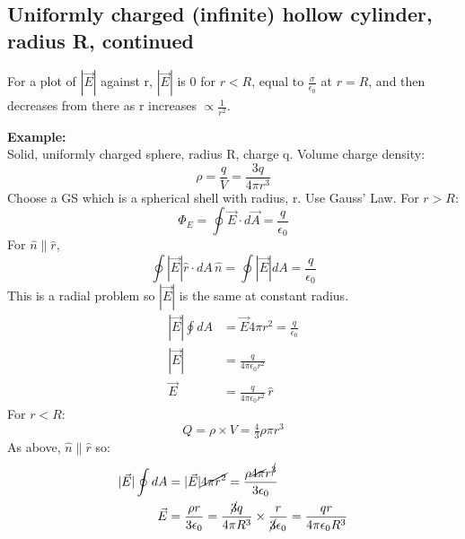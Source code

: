 \documentclass[a4paper, 11pt, normalem]{report}
\begin{document}
\chapter{}
\section{Uniformly charged (infinite) hollow cylinder, radius R, continued}

For a plot of $|\vec{E}|$ against r, $|\vec{E}|$ is 0 for $r < R$, equal to $\frac{\sigma}{\epsilon_{0}}$ at $r = R$, and then decreases from there as r increases $\propto \frac{1}{r^{2}}$.

\textbf{Example:}\\
Solid, uniformly charged sphere, radius R, charge q.
Volume charge density:
\begin{equation}
    \rho = \frac{q}{V} = \frac{3q}{4\pi r^{3}}
\end{equation}
Choose a GS which is a spherical shell with radius, r. 
Use Gauss' Law.
For $r > R$:
\begin{equation}
    \Phi_{E} = \oint \vec{E} \cdot d\vec{A} = \frac{q}{\epsilon_{0}}
\end{equation}
For $\hat{n} \parallel \hat{r}$,
\begin{equation}
    \oint |\vec{E}| \hat{r} \cdot dA \, \hat{n} = \oint |\vec{E}|dA = \frac{q}{\epsilon_{0}}
\end{equation}
This is a radial problem so $|\vec{E}|$ is the same at constant radius.
\begin{align}
    |\vec{E}| \oint dA &= \vec{E} 4\pi r^{2} = \frac{q}{\epsilon_{0}} \\
    |\vec{E}| &= \frac{q}{4\pi\epsilon_{0}r^{2}} \\
    \vec{E} &= \frac{q}{4\pi\epsilon_{0}r^{2}} \, \hat{r}
\end{align}
For $r < R$:
\begin{equation}
    Q = \rho \times V = \tfrac{4}{3}\rho\pi r^{3}
\end{equation}
As above, $\hat{n} \parallel \hat{r}$ so:
\begin{align}
    |\vec{E}| \oint dA &= |\vec{E}| \cancel{4\pi r^{2}} = \frac{\rho \cancel{4\pi}r^{\cancel{3}}}{3\epsilon_{0}} \\
    \vec{E} &= \frac{\rho r}{3\epsilon_{0}} = \frac{\cancel{3}q}{4\pi R^{3}} \times \frac{r}{\cancel{3}\epsilon_{0}} = \frac{qr}{4\pi \epsilon_{0} R^{3}}
\end{align}
\end{document}
